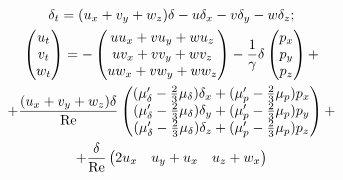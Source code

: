 \begin{gather*}


\delta_t=(u_x+v_y+w_z)\delta-u\delta_x-v\delta_y-w\delta_z;\\


%


\begin{pmatrix}


u_t \\ v_t \\ w_t


\end{pmatrix}


=-


\begin{pmatrix}


u u_x+vu_y+wu_z \\ uv_x+vv_y+wv_z \\ u w_x+vw_y+ww_z


\end{pmatrix}


-\frac{1}{\gamma}\delta


\begin{pmatrix}


p_x \\ p_y \\ p_z


\end{pmatrix}


+\\


%


+\frac{(u_x+v_y+w_z)\delta}{\re}


\begin{pmatrix}


(\mu_\delta'-\frac{2}{3}\mu_\delta)\delta_x+(\mu_p'-\frac{2}{3}\mu_p) p_x\\


(\mu_\delta'-\frac{2}{3}\mu_\delta) \delta_y+(\mu_p'-\frac{2}{3}\mu_p) p_y\\


(\mu_\delta'-\frac{2}{3}\mu_\delta) \delta_z+(\mu_p'-\frac{2}{3}\mu_p) p_z


\end{pmatrix}


+\\


%


+\frac{\delta}{\re}


\begin{pmatrix}


2u_x & u_y+u_x & u_z+w_x\\



\end{pmatrix}
\end{gather*}
